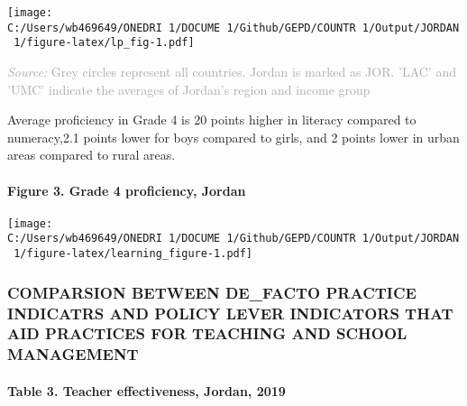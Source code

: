 \documentclass[twocolumn]{article}
\let\oldparagraph\paragraph
\renewcommand{\paragraph}[1]{\oldparagraph{#1}\mbox{}}
\begin{document}
\texttt{[image: C:/Users/wb469649/ONEDRI~1/DOCUME~1/Github/GEPD/COUNTR~1/Output/JORDAN~1/figure-latex/lp\_fig-1.pdf]}

{\scriptsize
    \textcolor{darkgray}{\textit{Source:} Grey circles represent all countries. Jordan is marked as JOR. 'LAC' and 'UMC' indicate the averages of Jordan's region and income group}
  }

Average proficiency in Grade 4 is 20 points higher in literacy compared
to numeracy,2.1 points lower for boys compared to girls, and 2 points
lower in urban areas compared to rural areas.\\
\vfill\null

\hypertarget{figure-3.-grade-4-proficiency-jordan}{%
\paragraph{Figure 3. Grade 4 proficiency,
Jordan}\label{figure-3.-grade-4-proficiency-jordan}}

\texttt{[image: C:/Users/wb469649/ONEDRI~1/DOCUME~1/Github/GEPD/COUNTR~1/Output/JORDAN~1/figure-latex/learning\_figure-1.pdf]}

\hypertarget{comparsion-between-de_facto-practice-indicatrs-and-policy-lever-indicators-that-aid-practices-for-teaching-and-school-management}{%
\subsubsection{\texorpdfstring{\textbf{COMPARSION BETWEEN DE\_FACTO
PRACTICE INDICATRS AND POLICY LEVER INDICATORS THAT AID PRACTICES FOR
TEACHING AND SCHOOL
MANAGEMENT}}{COMPARSION BETWEEN DE\_FACTO PRACTICE INDICATRS AND POLICY LEVER INDICATORS THAT AID PRACTICES FOR TEACHING AND SCHOOL MANAGEMENT}}\label{comparsion-between-de_facto-practice-indicatrs-and-policy-lever-indicators-that-aid-practices-for-teaching-and-school-management}}

\hypertarget{table-3.-teacher-effectiveness-jordan-2019}{%
\paragraph{Table 3. Teacher effectiveness, Jordan,
2019}\label{table-3.-teacher-effectiveness-jordan-2019}}
\end{document}
